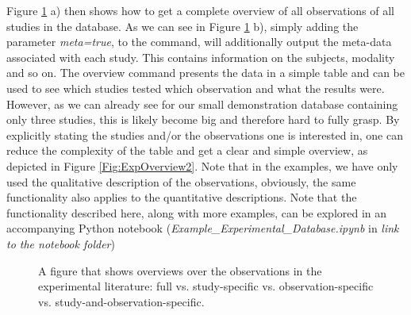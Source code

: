 \documentclass[a4paper,10pt]{article}
\begin{document}
Figure \ref{Fig:ExpOverview1} a) then shows how to get a complete overview of all observations of all studies in the database. As we can see in Figure \ref{Fig:ExpOverview1} b), simply adding the parameter \textit{meta=true},
to the command, will additionally output the meta-data associated with each study. This contains information on the subjects, modality and so on.
The overview command presents the data in a simple table and can be used to see which studies tested 
which observation and what the results were. However, as we can already see for our small demonstration database containing only three studies, this is likely become big and therefore hard to fully grasp.
By explicitly stating the studies and/or the observations one is interested in, one can reduce the complexity of the table and get a clear and simple overview, as depicted in Figure \ref{Fig:ExpOverview2}. Note that in the
examples, we have only used the qualitative description of the observations, obviously, the same functionality also applies to the quantitative descriptions. Note that the functionality described here, along with
more examples, can be explored in an accompanying Python notebook (\textit{Example\_Experimental\_Database.ipynb} in \textit{link to the notebook folder})

\begin{figure}
\caption{A figure that shows overviews over the observations in the experimental literature: full vs. study-specific vs. observation-specific vs. study-and-observation-specific.}
\label{Fig:ExpOverview1}
\end{figure}
\end{document}
